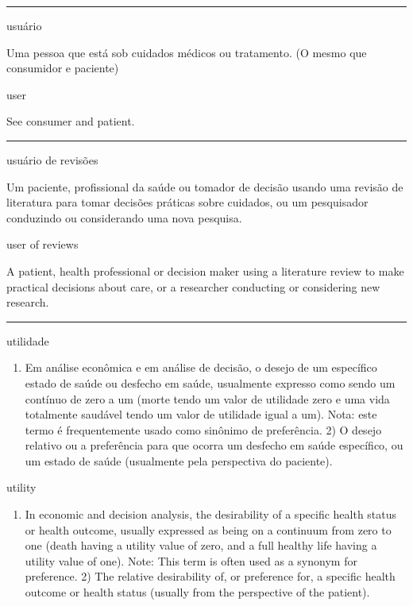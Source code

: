 \documentclass[
]{book}
\providecommand{\tightlist}{%
  \setlength{\itemsep}{0pt}\setlength{\parskip}{0pt}}
\begin{document}
\begin{center}\rule{0.5\linewidth}{0.5pt}\end{center}

usuário

Uma pessoa que está sob cuidados médicos ou tratamento. (O mesmo que consumidor e paciente)

user

See consumer and patient.

\begin{center}\rule{0.5\linewidth}{0.5pt}\end{center}

usuário de revisões

Um paciente, profissional da saúde ou tomador de decisão usando uma revisão de literatura para tomar decisões práticas sobre cuidados, ou um pesquisador conduzindo ou considerando uma nova pesquisa.

user of reviews

A patient, health professional or decision maker using a literature review to make practical decisions about care, or a researcher conducting or considering new research.

\begin{center}\rule{0.5\linewidth}{0.5pt}\end{center}

utilidade

\begin{enumerate}
\def\labelenumi{\arabic{enumi})}
\tightlist
\item
  Em análise econômica e em análise de decisão, o desejo de um específico estado de saúde ou desfecho em saúde, usualmente expresso como sendo um contínuo de zero a um (morte tendo um valor de utilidade zero e uma vida totalmente saudável tendo um valor de utilidade igual a um). Nota: este termo é frequentemente usado como sinônimo de preferência. 2) O desejo relativo ou a preferência para que ocorra um desfecho em saúde específico, ou um estado de saúde (usualmente pela perspectiva do paciente).
\end{enumerate}

utility

\begin{enumerate}
\def\labelenumi{\arabic{enumi})}
\tightlist
\item
  In economic and decision analysis, the desirability of a specific health status or health outcome, usually expressed as being on a continuum from zero to one (death having a utility value of zero, and a full healthy life having a utility value of one). Note: This term is often used as a synonym for preference. 2) The relative desirability of, or preference for, a specific health outcome or health status (usually from the perspective of the patient).
\end{enumerate}
\end{document}
